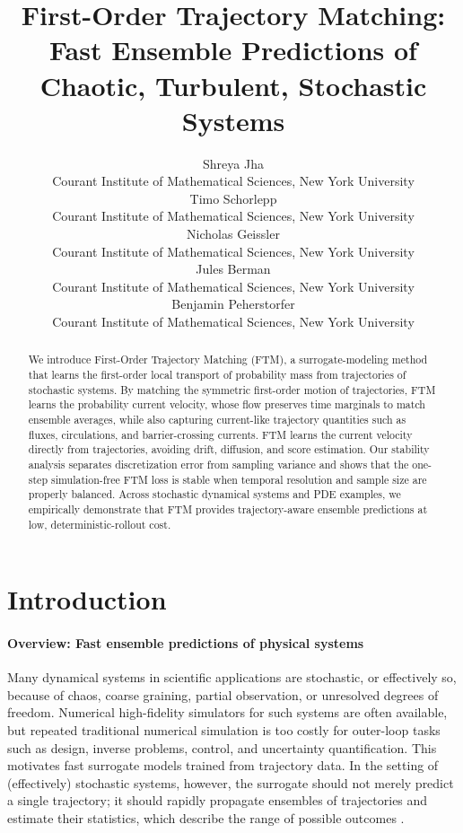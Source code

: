\documentclass[oneside,11pt]{article}
\title{First-Order Trajectory Matching: Fast Ensemble Predictions of Chaotic, Turbulent, Stochastic Systems}
\author{%
  \name Shreya Jha \\
  \addr Courant Institute of Mathematical Sciences, New York University\\
  \AND
  Timo Schorlepp\\
   \addr Courant Institute of Mathematical Sciences, New York University\\
   \AND
  Nicholas Geissler\\
   \addr Courant Institute of Mathematical Sciences, New York University\\
   \AND
  Jules Berman\\
   \addr Courant Institute of Mathematical Sciences, New York University\\
   \AND
  Benjamin Peherstorfer\\
   \addr Courant Institute of Mathematical Sciences, New York University
}
\theoremstyle{remark}
\begin{document}
\maketitle
\begin{abstract}
We introduce First-Order Trajectory Matching (FTM), a surrogate-modeling method that learns the first-order local transport of probability mass from trajectories of stochastic systems. By matching the symmetric first-order motion of trajectories, FTM learns the probability current velocity, whose flow preserves time marginals to match ensemble averages, while also capturing current-like trajectory quantities such as fluxes, circulations, and barrier-crossing currents.  FTM learns the current velocity directly from trajectories, avoiding drift, diffusion, and score estimation. Our stability analysis separates discretization error from sampling variance and shows that the one-step simulation-free FTM loss is stable when temporal resolution and sample size are properly balanced.  Across stochastic dynamical systems and PDE examples, we empirically demonstrate that FTM provides trajectory-aware ensemble predictions at low, deterministic-rollout cost. 
\end{abstract}

\section{Introduction}\label{sec:Intro}
\paragraph{Overview: Fast ensemble predictions of physical systems}
Many dynamical systems in scientific applications are stochastic, or effectively so, because of chaos, coarse graining, partial observation, or unresolved degrees of freedom. Numerical high-fidelity simulators for such systems are often available, but repeated traditional numerical simulation is too costly for outer-loop tasks such as design, inverse problems, control, and uncertainty quantification. This motivates fast surrogate models trained from trajectory data. In the setting of (effectively) stochastic systems, however, the surrogate should not merely predict a single trajectory; it should rapidly propagate ensembles of trajectories and estimate their statistics, which describe the range of possible outcomes \cite{annurev:/content/journals/10.1146/annurev-fluid-010719-060214,Karniadakis2021,sanderse2025closureSciML}.
\end{document}
